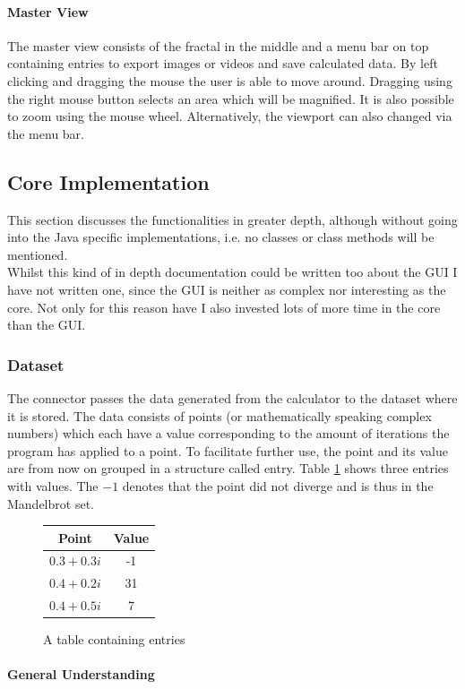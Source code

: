 \documentclass[10pt,a4paper,titlepage]{article}
\begin{document}
	\paragraph{Master View}
	The master view consists of the fractal in the middle and a menu bar on top containing entries to export images or videos and save calculated data. By left clicking and dragging the mouse the user is able to move around. Dragging using the right mouse button selects an area which will be magnified. It is also possible to zoom using the mouse wheel. Alternatively, the viewport can also changed via the menu bar.
	\subsection{Core Implementation}\label{sec:implementation}
	This section discusses the functionalities in greater depth, although without going into the Java specific implementations, i.e. no classes or class methods will be mentioned.\\
	Whilst this kind of in depth documentation could be written too about the GUI I have not written one, since the GUI is neither as complex nor interesting as the core. Not only for this reason have I also invested lots of more time in the core than the GUI.
	\subsubsection{Dataset}
	The connector passes the data generated from the calculator to the dataset where it is stored. The data consists of points (or mathematically speaking complex numbers) which each have a value corresponding to the amount of iterations the program has applied to a point. To facilitate further use, the point and its value are from now on grouped in a structure called entry. Table \ref{fig:entries} shows three entries with values. The \(-1\) denotes that the point did not diverge and is thus in the Mandelbrot set.
	\begin{figure}
		\centering
		\caption{A table containing entries}
		\label{fig:entries}
		\begin{tabular}{c|c}
			Point        & Value \\ \hline
			\(0.3+0.3i\) & -1    \\ \hline
			\(0.4+0.2i\) & 31    \\ \hline
			\(0.4+0.5i\) & 7     \\
		\end{tabular}
	\end{figure}
	\paragraph{General Understanding}
	
\end{document}
